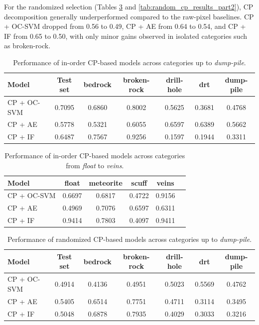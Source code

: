 \documentclass[pdflatex,sn-mathphys-ay]{sn-jnl}
\begin{document}
For the randomized selection (Tables \ref{tab:random_cp_results_part1} and \ref{tab:random_cp_results_part2}), CP decomposition generally underperformed compared to the raw-pixel baselines. CP + OC-SVM dropped from 0.56 to 0.49, CP + AE from 0.64 to 0.54, and CP + IF from 0.65 to 0.50, with only minor gains observed in isolated categories such as broken-rock.  

\begin{table}
\centering
\begin{tabular}{lcccccc}
\hline
\textbf{Model} & \textbf{Test set} & \textbf{bedrock} & \textbf{broken-rock} & \textbf{drill-hole} & \textbf{drt} & \textbf{dump-pile} \\
\hline
CP + OC-SVM & 0.7095 & 0.6860 & 0.8002 & 0.5625 & 0.3681 & 0.4768 \\
CP + AE     & 0.5778 & 0.5321 & 0.6055 & 0.6597 & 0.6389 & 0.5662 \\
CP + IF     & 0.6487 & 0.7567 & 0.9256 & 0.1597 & 0.1944 & 0.3311 \\
\hline
\end{tabular}
\caption{Performance of in-order CP-based models across categories up to \textit{dump-pile}.}
\label{tab:inOrder_cp_results_part1}
\end{table}

\begin{table}
\centering
\begin{tabular}{lccccc}
\hline
\textbf{Model} & \textbf{float} & \textbf{meteorite} & \textbf{scuff} & \textbf{veins} \\
\hline
CP + OC-SVM & 0.6697 & 0.6817 & 0.4722 & 0.9156 \\
CP + AE     & 0.4969 & 0.7076 & 0.6597 & 0.6311 \\
CP + IF     & 0.9414 & 0.7803 & 0.4097 & 0.9411 \\
\hline
\end{tabular}
\caption{Performance of in-order CP-based models across categories from \textit{float} to \textit{veins}.}
\label{tab:inOrder_cp_results_part2}
\end{table}

\begin{table}
\centering
\begin{tabular}{lcccccc}
\hline
\textbf{Model} & \textbf{Test set} & \textbf{bedrock} & \textbf{broken-rock} & \textbf{drill-hole} & \textbf{drt} & \textbf{dump-pile} \\
\hline
CP + OC-SVM & 0.4914 & 0.4136 & 0.4951 & 0.5023 & 0.5569 & 0.4762 \\
CP + AE     & 0.5405 & 0.6514 & 0.7751 & 0.4711 & 0.3114 & 0.3495 \\
CP + IF     & 0.5048 & 0.6878 & 0.7935 & 0.4029 & 0.3033 & 0.3216 \\
\hline
\end{tabular}
\caption{Performance of randomized CP-based models across categories up to \textit{dump-pile}.}
\label{tab:random_cp_results_part1}
\end{table}
\end{document}
